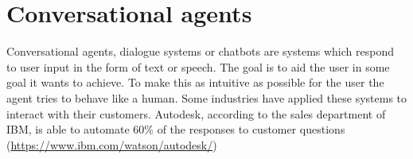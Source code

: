 \section{Conversational agents}
\label{sec:conversational_agents}

Conversational agents, dialogue systems or chatbots are systems which respond to user input in the form of text or speech.
The goal is to aid the user in some goal it wants to achieve.
To make this as intuitive as possible for the user the agent tries to behave like a human.
Some industries have applied these systems to interact with their customers.
Autodesk, according to the sales department of IBM, is able to automate 60\% of the responses to customer questions (\url{https://www.ibm.com/watson/autodesk/})





